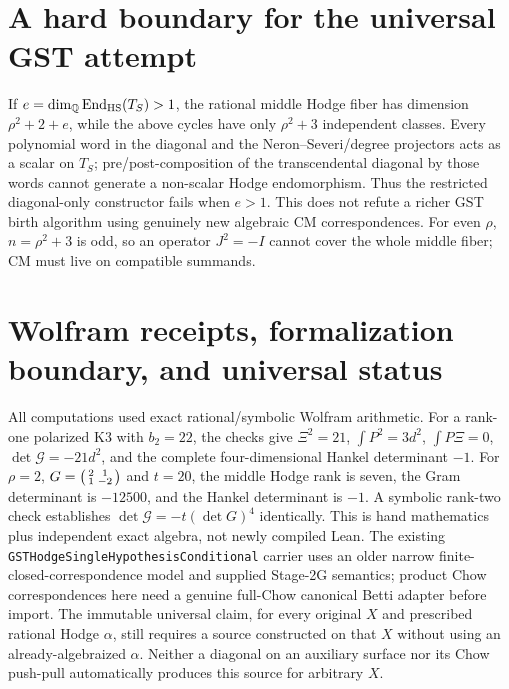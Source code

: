 \documentclass[11pt]{article}
\newcommand{\Q}{\mathbb Q}
\newcommand{\End}{\mathrm{End}}
\begin{document}
\section{A hard boundary for the universal GST attempt}
If $e=\dim_\Q\End_{\rm HS}(T_S)>1$, the rational middle Hodge fiber has dimension $\rho^2+2+e$, while the above cycles have only $\rho^2+3$ independent classes. Every polynomial word in the diagonal and the Neron--Severi/degree projectors acts as a scalar on $T_S$; pre/post-composition of the transcendental diagonal by those words cannot generate a non-scalar Hodge endomorphism. Thus the restricted diagonal-only constructor fails when $e>1$. This does not refute a richer GST birth algorithm using genuinely new algebraic CM correspondences. For even $\rho$, $n=\rho^2+3$ is odd, so an operator $J^2=-I$ cannot cover the whole middle fiber; CM must live on compatible summands.

\section{Wolfram receipts, formalization boundary, and universal status}
All computations used exact rational/symbolic Wolfram arithmetic. For a rank-one polarized K3 with $b_2=22$, the checks give $\Xi^2=21$, $\int P^2=3d^2$, $\int P\Xi=0$, $\det\mathcal G=-21d^2$, and the complete four-dimensional Hankel determinant $-1$. For $\rho=2$, $G=\begin{psmallmatrix}2&1\\1&-2\end{psmallmatrix}$ and $t=20$, the middle Hodge rank is seven, the Gram determinant is $-12500$, and the Hankel determinant is $-1$. A symbolic rank-two check establishes $\det\mathcal G=-t(\det G)^4$ identically.
This is hand mathematics plus independent exact algebra, not newly compiled Lean. The existing \texttt{GSTHodgeSingleHypothesisConditional} carrier uses an older narrow finite-closed-correspondence model and supplied Stage-2G semantics; product Chow correspondences here need a genuine full-Chow canonical Betti adapter before import. The immutable universal claim, for every original $X$ and prescribed rational Hodge $\alpha$, still requires a source constructed on that $X$ without using an already-algebraized $\alpha$. Neither a diagonal on an auxiliary surface nor its Chow push-pull automatically produces this source for arbitrary $X$.
\end{document}
